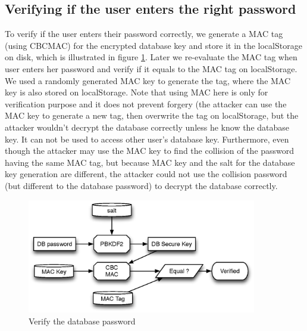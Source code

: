 \subsection{Verifying if the user enters the right password}
\label{sec:verify}
To verify if the user enters their password correctly, we generate a MAC tag (using CBCMAC) for the encrypted database key and store it in the localStorage on disk, which is illustrated in figure \ref{fig:verify_dbkeys}. Later we re-evaluate the MAC tag when user enters her password and verify if it equals to the MAC tag on localStorage. We used a randomly generated MAC key to generate the tag, where the MAC key is also stored on localStorage. Note that using MAC here is only for verification purpose and it does not prevent forgery (the attacker can use the MAC key to generate a new tag, then overwrite the tag on localStorage, but the attacker wouldn't decrypt the database correctly unless he know the database key. It can not be used to access other user's database key. Furthermore, even though the attacker may use the MAC key to find the collision of the password having the same MAC tag, but because MAC key and the salt for the database key generation are different, the attacker could not use the collision password (but different to the database password) to decrypt the database correctly. 
\begin{figure}[h!]
\centering
\caption{Verify the database password}
\label{fig:verify_dbkeys}
\includegraphics[height=5cm]{fig/verify_dbkeys.eps}
\end{figure}

